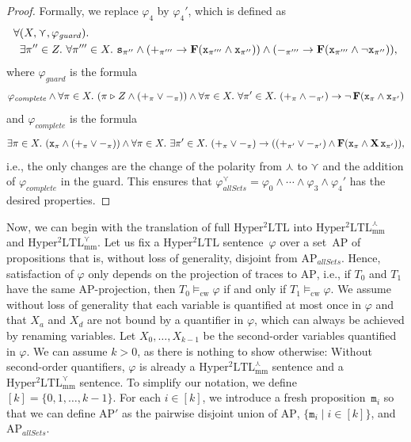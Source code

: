 \documentclass[dvipsnames,10pt,a4paper]{amsart}
\theoremstyle{definition}
\theoremstyle{remark}
\renewcommand{\phi}{\varphi}
\newcommand{\set}[1]{\{#1\}}
\newcommand{\F}{\mathop{\mathbf{F}\vphantom{a}}\nolimits}
\newcommand{\X}{\mathop{\mathbf{X}\vphantom{a}}\nolimits}
\newcommand{\sohyltl}{\mathrm{Hyper^2LTL}\xspace}
\newcommand{\sohyltlfpmax}{\mathrm{Hyper^2LTL_{\mathrm{mm}}^{\largest}}\xspace}
\newcommand{\sohyltlfpmin}{\mathrm{Hyper^2LTL_{\mathrm{mm}}^{\smallest}}\xspace}
\newcommand{\ap}[0]{\mathrm{AP}}
\newcommand{\univar}{X_a}
\newcommand{\unidisvar}{X_d}
\newcommand{\smallest}{\curlyvee}
\newcommand{\largest}{\curlywedge}
\newcommand{\posprop}{\mathtt{+}}
\newcommand{\negprop}{\mathtt{-}}
\newcommand{\setprop}{\mathtt{s}}
\newcommand{\inprop}{\mathtt{x}}
\newcommand{\allsets}{{\mathit{allSets}}}
\newcommand{\tracein}{\mathrel{\triangleright}}
\newcommand{\cw}{\mathrm{cw}}
\newcommand{\marker}{\texttt{m}}
\newcommand{\complete}{\mathit{complete}}
\newcommand{\guard}{\mathit{guard}}
\begin{document}
\begin{proof}
Formally, we replace $\phi_4$ by $\phi_4'$, which is defined as 
\begin{align*}
\forall {}&{}(X, \smallest, \phi_\guard) .\\
&{}\exists \pi'' \in Z.\ \forall \pi''' \in X.\ \setprop_{\pi''} \wedge  {(\posprop_{\pi'''} \rightarrow \F(\inprop_{\pi'''} \wedge \inprop_{\pi''}))}
\wedge 
{(\negprop_{\pi'''} \rightarrow \F(\inprop_{\pi'''} \wedge \neg\inprop_{\pi''}))},
\end{align*} 
where $\phi_\guard$ is the formula
\[
 \phi_\complete  \wedge \forall \pi \in X.\ (\pi\tracein Z \wedge (\posprop_\pi \vee \negprop_\pi)) \wedge \forall \pi \in X.\ \forall \pi' \in X.\ (\posprop_\pi \wedge \negprop_{\pi'}) \rightarrow \neg \F(\inprop_{\pi} \wedge \inprop_{\pi'})
\]
and $\phi_\complete$ is the formula
\[
\exists \pi \in X.\ (\inprop_\pi \wedge (\posprop_\pi \vee \negprop_\pi)) \wedge \forall \pi \in X.\ \exists \pi' \in X.\ (\posprop_\pi \vee \negprop_\pi) \rightarrow ((\posprop_{\pi'} \vee \negprop_{\pi'}) \wedge \F( \inprop_\pi \wedge \X\inprop_{\pi'})),
\]
i.e., the only changes are the change of the polarity from $\largest$ to $\smallest$ and the addition of $\phi_\complete$ in the guard.
This ensures that $\phi_\allsets^\smallest = \phi_0 \wedge \cdots \wedge \phi_3 \wedge \phi_4'$ has the desired properties.
\end{proof}

Now, we can begin with the translation of full $\sohyltl$ into $\sohyltlfpmax$ and $\sohyltlfpmin$.
Let us fix a $\sohyltl$ sentence~$\varphi$ over a set~$\ap$ of propositions that is, without loss of generality, disjoint from $\ap_\allsets$.
Hence, satisfaction of $\phi$ only depends on the projection of traces to $\ap$, i.e., if $T_0$ and $T_1$ have the same $\ap$-projection, then $T_0 \models_\cw \phi$ if and only if $T_1 \models_\cw\phi$. 
We assume without loss of generality that each variable is quantified at most once in $\phi$ and that $\univar$ and $\unidisvar$ are not bound by a quantifier in $\phi$, which can always be achieved by renaming variables. 
Let $X_0, \ldots, X_{k-1}$ be the second-order variables quantified in $\phi$. 
We can assume $k>0$, as there is nothing to show otherwise: Without second-order quantifiers, $\phi$ is already a $\sohyltlfpmax$ sentence and a $\sohyltlfpmin$ sentence.
To simplify our notation, we define $[k] = \set{0,1,\ldots, k-1}$.
For each $i \in [k]$, we introduce a fresh proposition~$\marker_{i}$ so that we can define $\ap'$ as the pairwise disjoint union of $\ap$, $\set{\marker_{i} \mid i \in [k]}$, and $\ap_\allsets$.
\end{document}

